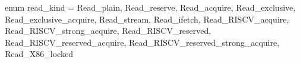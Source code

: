 enum read_kind = {
  Read_plain,
  Read_reserve,
  Read_acquire,
  Read_exclusive,
  Read_exclusive_acquire,
  Read_stream,
  Read_ifetch,
  Read_RISCV_acquire,
  Read_RISCV_strong_acquire,
  Read_RISCV_reserved,
  Read_RISCV_reserved_acquire,
  Read_RISCV_reserved_strong_acquire,
  Read_X86_locked
}
